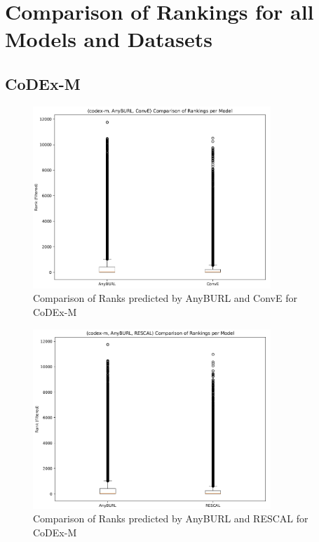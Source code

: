\section{Comparison of Rankings for all Models and Datasets}
\label{appendix:rankings}

\subsection{CoDEx-M}

\begin{figure}[H]
\centering
\includegraphics[width=0.8\textwidth]{images/ranks_anyburl_conve_codex.png}
\caption{Comparison of Ranks predicted by AnyBURL and ConvE for CoDEx-M}
\label{fig:ranks_anyburl_conve_codex}
\end{figure}

\begin{figure}[H]
\centering
\includegraphics[width=0.8\textwidth]{images/ranks_anyburl_rescal_codex.png}
\caption{Comparison of Ranks predicted by AnyBURL and RESCAL for CoDEx-M}
\label{fig:ranks_anyburl_rescal_codex}
\end{figure}

